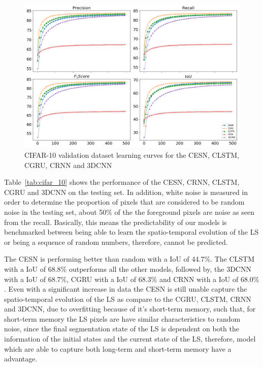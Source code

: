 \documentclass{WitsPhysicsReport}
\begin{document}
\begin{figure}[H]
\centering
  \includegraphics[width=1\textwidth]{Figure/Results/CIFAR_10_performance.png}
\caption{CIFAR-10 validation dataset learning curves for the CESN, CLSTM, CGRU, CRNN and 3DCNN}
 \label{fig:cifar_10_model_perfomance}
\end{figure}

Table~\ref{tab:cifar_10} shows the performance of the CESN, CRNN, CLSTM, CGRU and 3DCNN on the testing set. In addition, white noise is measured in order to determine the proportion of pixels that are considered to be random noise in the testing set, about 50\% of the the foreground pixels are noise as seen from the recall. Basically, this means the predictability of our models is benchmarked between being able to learn the spatio-temporal evolution of the LS or being a sequence of random numbers, therefore, cannot be predicted.  

The CESN is performing better than random with a IoU of 44.7\%. The CLSTM with a IoU of 68.8\% outperforms all the other models, followed by, the 3DCNN with a IoU of 68.7\%, CGRU with a IoU of 68.3\% and CRNN with a IoU of 68.0\% . Even with a significant increase in data the CESN is still unable capture the spatio-temporal evolution of the LS as compare to the CGRU, CLSTM, CRNN and 3DCNN, due to overfitting  because of it's short-term memory, such that, for short-term memory the LS pixels are have similar characteristics to random noise, since the final segmentation state of the LS is dependent on both the information of the initial states and the current state of the LS, therefore, model which are able to capture both long-term and short-term memory have a advantage. 
\end{document}
